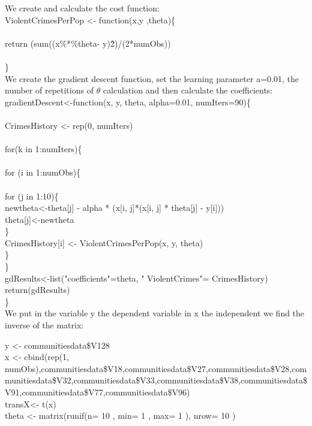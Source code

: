 \documentclass[10pt,a4paper]{article}
\begin{document}
	We create and calculate the cost function:\\
	ViolentCrimesPerPop <- function(x,y ,theta)\{\\
	\\
	return (sum((x\%*\%theta- y)\^2)/(2*numObs))\\
	\\
	\}\\
	
	We create the gradient descent function, set the learning parameter a=0.01, the number of repetitions of $\theta$ calculation and then calculate the coefficients:\\
	
	gradientDescent<-function(x, y, theta, alpha=0.01, numIters=90)\{\\
	\\
	CrimesHistory <- rep(0, numIters)\\
	\\
	for(k in 1:numIters)\{\\
	\\
	for (i in 1:numObs)\{\\
	\\
	for (j in 1:10)\{\\
	
	newtheta<-theta[j] - alpha * (x[i, j]*(x[i, j] * theta[j] - y[i]))\\
	theta[j]<-newtheta\\
	\}\\
	CrimesHistory[i]  <- ViolentCrimesPerPop(x, y, theta)\\
	\}\\
	\}\\
	gdResults<-list("coefficients"=theta, " ViolentCrimes"= CrimesHistory)\\
	return(gdResults)\\
	\}\\
	
	We put in the variable y the dependent variable in x the independent we find the inverse of the matrix:
	
	y <- communitiesdata\$V128 \\
	x <- cbind(rep(1, numObs),communitiesdata\$V18,communitiesdata\$V27,communitiesdata\$V28,communitiesdata\$V32,communitiesdata\$V33,communitiesdata\$V38,communitiesdata\$V91,communitiesdata\$V77,communitiesdata\$V96)\\
	transX<- t(x)\\                      
	theta <- matrix(runif(n= 10 , min= 1 , max= 1 ), nrow= 10 )\\
	
\end{document}
